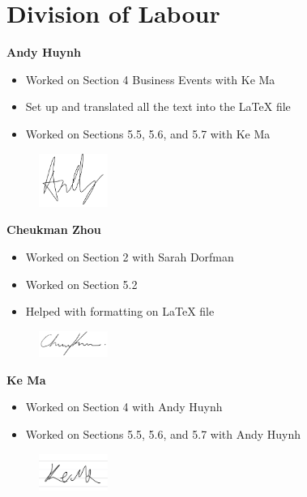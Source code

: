 \appendix
\section{Division of Labour}
\label{sec:division_of_labour}

\textbf{Andy Huynh}
\begin{itemize}
    \item Worked on Section 4 Business Events with Ke Ma
    \item Set up and translated all the text into the LaTeX file
    \item Worked on Sections 5.5, 5.6, and 5.7 with Ke Ma
\end{itemize}
\begin{figure}[H]
	\centering
	\includegraphics[width=0.2\textwidth]{Signatures/a.png}  
\end{figure}

\textbf{Cheukman Zhou}
\begin{itemize}
    \item Worked on Section 2 with Sarah Dorfman
    \item Worked on Section 5.2
    \item Helped with formatting on LaTeX file
\end{itemize}
\begin{figure}[H]
	\centering
	\includegraphics[width=0.2\textwidth]{Signatures/c.png}
\end{figure}

\textbf{Ke Ma}
\begin{itemize}
    \item Worked on Section 4 with Andy Huynh
    \item Worked on Sections 5.5, 5.6, and 5.7 with Andy Huynh
\end{itemize}
\begin{figure}[H]
	\centering
	\includegraphics[width=0.2\textwidth]{Signatures/k.png}
\end{figure}

